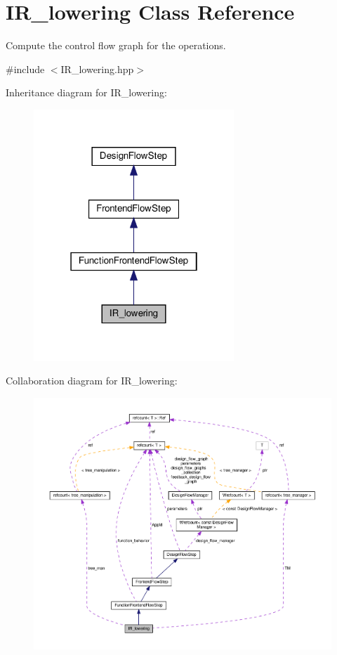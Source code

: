 \hypertarget{classIR__lowering}{}\section{I\+R\+\_\+lowering Class Reference}
\label{classIR__lowering}


Compute the control flow graph for the operations.  




{\ttfamily \#include $<$I\+R\+\_\+lowering.\+hpp$>$}



Inheritance diagram for I\+R\+\_\+lowering\+:
\nopagebreak
\begin{figure}[H]
\begin{center}
\leavevmode
\includegraphics[width=214pt]{d0/d16/classIR__lowering__inherit__graph}
\end{center}
\end{figure}


Collaboration diagram for I\+R\+\_\+lowering\+:
\nopagebreak
\begin{figure}[H]
\begin{center}
\leavevmode
\includegraphics[width=350pt]{d8/d9c/classIR__lowering__coll__graph}
\end{center}
\end{figure}
